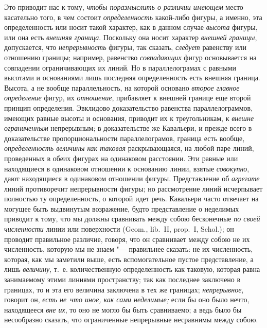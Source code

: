 Это приводит нас к тому, {\em чтобы поразмыслить о различии имеющем} место
касательно того, в чем состоит {\em определенность} какой-либо фигуры, а
именно, эта определенность или носит такой характер, как в данном случае
{\em высота} фигуры, или она есть {\em внешняя граница}. Поскольку она носит
характер {\em внешней границы}, допускается, что {\em непрерывность} фигуры,
так сказать, {\em следует} равенству или отношению границы; например, равенство
{\em совпадающих} фигур основывается на совпадении ограничивающих их линий. Но
в параллелограмах с равными высотами и основаниями лишь последняя
определенность есть внешняя граница. Высота, а не вообще параллельность, на
которой основано {\em второе главное определение} фигур, их {\em отношение},
прибавляет к внешней границе еще второй принцип определения. Эвклидово
доказательство равенства параллелограммов, имеющих равные высоты и основания,
приводит их к треугольникам, к {\em внешне ограниченным} непрерывным; в
доказательстве же Кавальери, и прежде всего в доказательстве пропорциональности
параллелограмов, граница есть вообще, {\em определенность величины как таковая}
раскрывающаяся, на любой паре линий, проведенных в обеих фигурах на одинаковом
расстоянии. Эти равные или находящиеся в одинаковом отношении к основанию
линии, взятые {\em совокупно}, дают находящиеся в одинаковом отношении фигуры.
Представление об {\em агрегате} линий противоречит непрерывности фигуры; но
рассмотрение линий исчерпывает полностью ту определенность, о которой идет
речь. Кавальери часто отвечает на могущее быть выдвинутым возражение, будто
представление о неделимых приводит к тому, что мы должны сравнивать между собою
бесконечные {\em по своей численности} линии или поверхности (Geom., lib.~II,
prop.~I, Schol.); он проводит правильное различие, говоря, что он сравнивает
между собою не их численность, которую мы не знаем "--- правильнее сказать: не
их численность, которая, как мы заметили выше, есть вспомогательное пустое
представление, а лишь {\em величину}, т.~е. количественную определенность как
таковую, которая равна занимаемому этими линиями пространству; так как
последнее заключено в границах, то и эта его величина заключена в тех же
границах; {\em непрерывное}, говорит он, {\em есть не~что иное, как сами
неделимые;} если бы оно было нечто, находящееся {\em вне их}, то оно не могло
бы быть сравниваемо; а ведь было бы несообразно сказать, что ограниченные
непрерывные несравнимы между собою.

